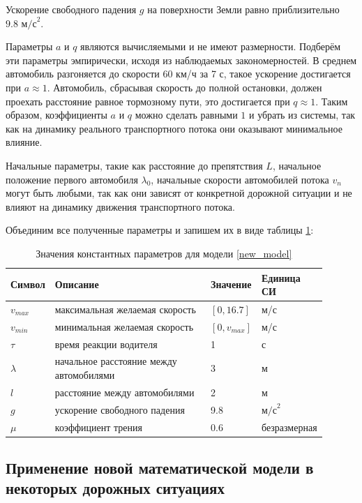 \documentclass[12pt, a4paper]{extarticle}
\numberwithin{equation}{section}
\numberwithin{figure}{section}
\begin{document}
Ускорение свободного падения $g$ на поверхности Земли равно приблизительно $9.8 \text{ м/с}^2$.

Параметры $a$ и $q$ являются вычисляемыми и не имеют размерности. Подберём эти параметры эмпирически, исходя из наблюдаемых закономерностей. В среднем автомобиль разгоняется до скорости 60 км/ч за 7 с, такое ускорение достигается при $a\approx1$. Автомобиль, сбрасывая скорость до полной остановки, должен проехать расстояние равное тормозному пути, это достигается при $q\approx1$. Таким образом, коэффициенты $a$ и $q$ можно сделать равными $1$ и убрать из системы, так как на динамику реального транспортного потока они оказывают минимальное влияние.

Начальные параметры, такие как расстояние до препятствия $L$, начальное положение первого автомобиля $\lambda_0$, начальные скорости автомобилей потока $v_n$ могут быть любыми, так как они зависят от конкретной дорожной ситуации и не влияют на динамику движения транспортного потока.

Объединим все полученные параметры и запишем их в виде таблицы \ref{real_parameters}:
\begin{table}[h!]
	\caption{Значения константных параметров для модели \eqref{new_model} }
	\label{real_parameters}
	\begin{center}
		\begin{tabularx}{\textwidth}{p{0.12\linewidth}p{0.52\linewidth}p{0.11\linewidth}p{0.15\linewidth}}			
			\hline
			\rule{0cm}{0,5cm}
			Символ & Описание & Значение & Единица СИ \\
			[3pt]\hline
			$v_{max}$ & максимальная желаемая скорость& $[0,16.7]$&м/с\\
			$v_{min}$ & минимальная желаемая скорость& $[0,v_{max}]$&м/с\\ 
			$\tau$ & время реакции водителя& 1&с\\
			$\lambda$ & начальное расстояние между автомобилями& 3&м\\
			$l$ & расстояние между автомобилями& 2&м\\
			$g$ & ускорение свободного падения& 9.8&$\text{м/с}^2$\\ 
			$\mu$ & коэффициент трения& 0.6& безразмерная\\ 
			\hline
		\end{tabularx}
	\end{center}
\end{table}
\newline 

\subsection{Применение новой математической модели в некоторых дорожных ситуациях}
\end{document}
